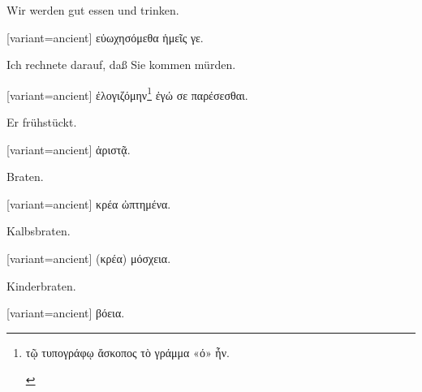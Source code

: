Wir werden gut essen und trinken.

\switchcolumn

\begin{greek}[variant=ancient]%
εὐωχησόμεθα ἡμεῖς γε.

\end{greek}%
\switchcolumn*

Ich rechnete darauf, daß Sie kommen mürden.

\switchcolumn

\begin{greek}[variant=ancient]%
ἐλογιζόμην\footnote{\begin{latin}%
\textgreek[variant=ancient]{τῷ τυπογράφῳ ἄσκοπος τὸ γράμμα «ό» ἦν.}\end{latin}%
} ἐγώ σε παρέσεσθαι.

\end{greek}%
\switchcolumn*

Er frühstückt.

\switchcolumn

\begin{greek}[variant=ancient]%
ἀριστᾷ.

\end{greek}%
\switchcolumn*

\myafterpagetrue{}Braten. 

\switchcolumn

\begin{greek}[variant=ancient]%
κρέα ὠπτημένα.

\end{greek}%
\switchcolumn*\bgroup{} Kalbs\textcompwordmark{}braten.

\egroup\switchcolumn\bgroup

\begin{greek}[variant=ancient]%
(κρέα) μόσχεια.

\end{greek}%
\egroup\switchcolumn*\bgroup

Kinderbraten. 

\egroup\switchcolumn\bgroup

\begin{greek}[variant=ancient]%
βόεια.

\end{greek}%
\egroup\switchcolumn*\bgroup

